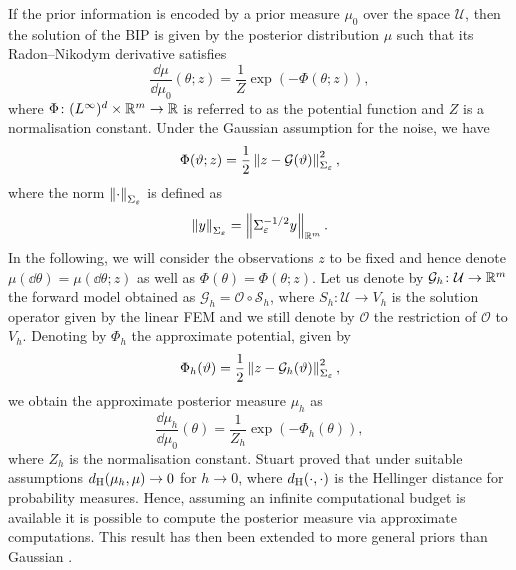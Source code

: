 \documentclass[10pt]{article}
\begin{document}
If the prior information is encoded by a prior measure $\mu_0$ over the space $\mathcal U$, then the solution of the BIP is given by the posterior distribution $\mu$ such that its Radon--Nikodym derivative satisfies
\begin{equation}
	\frac{\dd \mu}{\dd \mu_0}(\theta; z) = \frac{1}{Z}\exp(-\Phi(\theta; z)),
\end{equation}
where $\Phi \colon (L^{\infty})^d \times \mathbb{R}^m \to \mathbb{R}$ is referred to as the potential function and $Z$ is a normalisation constant. Under the Gaussian assumption for the noise, we have
\begin{equation}
	\Phi(\vartheta; z) = \frac{1}{2} \left\|z - \mathcal G(\vartheta)\right\|_{\Sigma_\varepsilon}^2,
\end{equation} 
where the norm $\left\|\cdot\right\|_{\Sigma_\varepsilon}$ is defined as
\begin{equation}
	\left\|y\right\|_{\Sigma_\varepsilon} = \left\|\Sigma_\varepsilon^{-1/2} y\right\|_{\mathbb{R}^m}.
\end{equation}
In the following, we will consider the observations $z$ to be fixed and hence denote $\mu(\dd \theta) = \mu(\dd \theta; z)$ as well as $\Phi(\theta) = \Phi(\theta; z)$. Let us denote by $\mathcal G_h \colon \mathcal U \to \mathbb{R}^m$ the forward model obtained as $\mathcal G_h = \mathcal O \circ \mathcal S_h$, where $S_h \colon \mathcal U  \to V_h$ is the solution operator given by the linear FEM and we still denote by $\mathcal O$ the restriction of $\mathcal O$ to $V_h$. Denoting by $\Phi_h$ the approximate potential, given by
\begin{equation}\label{eq:ApproxPotential}
	\Phi_h(\vartheta) = \frac{1}{2} \left\|z - \mathcal G_h(\vartheta)\right\|_{\Sigma_\varepsilon}^2,
\end{equation} 
we obtain the approximate posterior measure $\mu_h$ as 
\begin{equation}\label{eq:ApproxPosterior}
	\frac{\dd \mu_h}{\dd \mu_0}(\theta) = \frac{1}{Z_h}\exp(-\Phi_h(\theta)),
\end{equation}
where $Z_h$ is the normalisation constant. Stuart proved \cite[Theorem 4.6]{Stu10} that under suitable assumptions $d_{\mathrm{H}}(\mu_h, \mu) \to 0$ for $h \to 0$, where $d_{\mathrm{H}}(\cdot, \cdot)$ is the Hellinger distance for probability measures. Hence, assuming an infinite computational budget is available it is possible to compute the posterior measure via approximate computations. This result has then been extended to more general priors than Gaussian \cite{DaS16, Sul17}.
\end{document}
